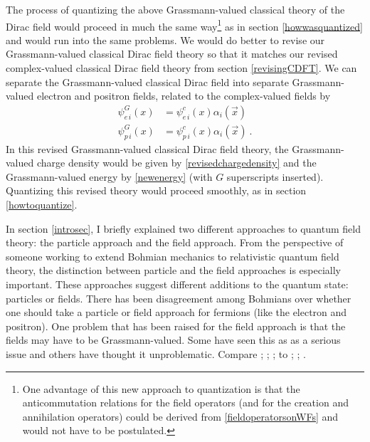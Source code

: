 \documentclass[onecolumn,secnumarabic,amsmath,amssymb,balancelastpage,nofootinbib]{article}
\begin{document}
The process of quantizing the above Grassmann-valued classical theory of the Dirac field would proceed in much the same way\footnote{One advantage of this new approach to quantization is that the anticommutation relations for the field operators (and for the creation and annihilation operators) could be derived from \eqref{fieldoperatorsonWFs} and would not have to be postulated.} as in section \ref{howwasquantized} and would run into the same problems.  We would do better to revise our Grassmann-valued classical Dirac field theory so that it matches our revised complex-valued classical Dirac field theory from section \ref{revisingCDFT}.  We can separate the Grassmann-valued classical Dirac field into separate Grassmann-valued electron and positron fields, related to the complex-valued fields by
\begin{align}
\psi^G_{e\,i}(x)&=\psi^c_{e\,i}(x) \alpha_i(\vec{x})
\nonumber
\\
\psi^G_{p\,i}(x)&=\psi^c_{p\,i}(x) \alpha_i(\vec{x})
\ .
\end{align}
In this revised Grassmann-valued classical Dirac field theory, the Grassmann-valued charge density would be given by \eqref{revisedchargedensity} and the Grassmann-valued energy by \eqref{newenergy} (with $G$ superscripts inserted).  Quantizing this revised theory would proceed smoothly, as in section \ref{howtoquantize}.

In section \ref{introsec}, I briefly explained two different approaches to quantum field theory: the particle approach and the field approach.  From the perspective of someone working to extend Bohmian mechanics to relativistic quantum field theory, the distinction between particle and the field approaches is especially important.  These approaches suggest different additions to the quantum state: particles or fields.  There has been disagreement among Bohmians over whether one should take a particle or field approach for fermions (like the electron and positron).  One problem that has been raised for the field approach is that the fields may have to be Grassmann-valued.  Some have seen this as as a serious issue and others have thought it unproblematic.  Compare \citet[pg.\ 374]{bohm1987}; \citet[pg.\ 156]{kaloyerou1996}; \citet[sec.\ 9.2]{struyve2010}; \citet[sec.\ 3.3]{struyve2011} to \citet[sec.\ 4.2]{valentini1992}; \citet{valentini1996}; \citet[pg.\ 519]{holland}.
\end{document}
